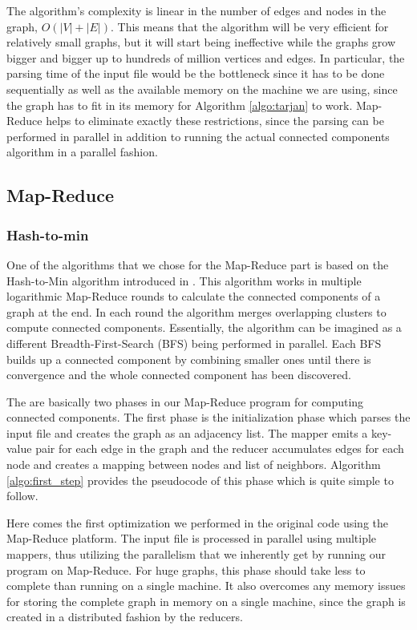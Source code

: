 The algorithm's complexity is linear in the number of edges and nodes in the graph, \ie $O(|V| + |E|)$. This means that the algorithm will be very efficient for relatively small graphs, but it will start being ineffective while the graphs grow bigger and bigger up to hundreds of million vertices and edges. In particular, the parsing time of the input file would be the bottleneck since it has to be done sequentially as well as the available memory on the machine we are using, since the graph has to fit in its memory for Algorithm \ref{algo:tarjan} to work. Map-Reduce helps to eliminate exactly these restrictions, since the parsing can be performed in parallel in addition to running the actual connected components algorithm in a parallel fashion.

\subsection{Map-Reduce}

\subsubsection{Hash-to-min}


One of the algorithms that we chose for the Map-Reduce part is based on the Hash-to-Min algorithm introduced in \cite{rastogi}. This algorithm works in multiple logarithmic Map-Reduce rounds  to calculate the connected components of a graph at the end. In each round the algorithm merges overlapping clusters to compute connected components. Essentially, the algorithm can be imagined as a different Breadth-First-Search (\eg BFS) being performed in parallel. Each BFS builds up a connected component by combining smaller ones until there is convergence and the whole connected component has been discovered.

The are basically two phases in our Map-Reduce program for computing connected components. The first phase is the initialization phase which parses the input file and creates the graph as an adjacency list. The mapper emits a key-value pair for each edge in the graph and the reducer accumulates edges for each node and creates a mapping between nodes and list of neighbors. Algorithm \ref{algo:first_step} provides the pseudocode of this phase which is quite simple to follow.

Here comes the first optimization we performed in the original code using the Map-Reduce platform. The input file is processed in parallel using multiple mappers, thus utilizing the parallelism that we inherently get by running our program on Map-Reduce. For huge graphs, this phase should take less to complete than running on a single machine. It also overcomes any memory issues for storing the complete graph in memory on a single machine, since the graph is created in a distributed fashion by the reducers.

